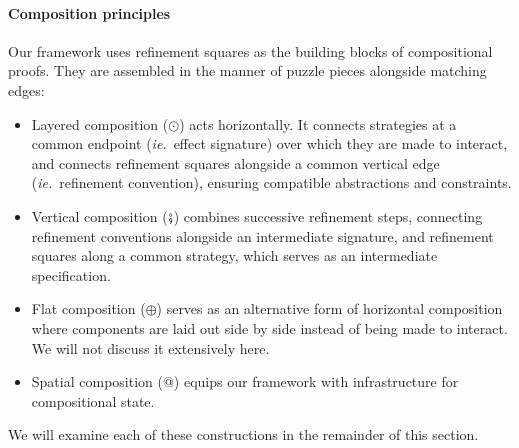 
\vspace*{-2ex}
\paragraph{Composition principles} %

Our framework uses
refinement squares as the building blocks of compositional proofs.
They are assembled in the manner of puzzle pieces
alongside matching edges:
\begin{itemize}
\item Layered composition ($\odot$) acts horizontally.
  It connects strategies at a common endpoint (\emph{ie.}~effect signature)
  over which they are made to interact,
  and connects refinement squares alongside a common
  vertical edge (\emph{ie.}~refinement convention),
  ensuring compatible abstractions and constraints.
\item Vertical composition ($\fatsemi$)
  combines successive refinement steps,
  connecting refinement conventions alongside an intermediate signature,
  and refinement squares along a common strategy,
  which serves as an intermediate specification.
\item Flat composition ($\oplus$)
  serves as an alternative form of horizontal composition
  where components are laid out side by side
  instead of being made to interact.
  We will not discuss it extensively here.
\item Spatial composition ($\mathbin@$)
  equips our framework with infrastructure
  for compositional state.
\end{itemize}
We will examine each of these constructions in the remainder of this section.



